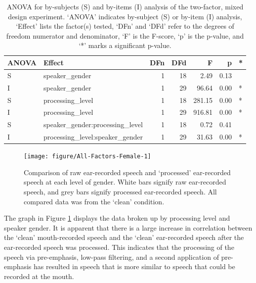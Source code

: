 \begin{table}[ht]
\centering
\begin{tabular}{llrrrrl}
  \hline
ANOVA & Effect & DFn & DFd & F & p & * \\ 
  \hline
S & speaker\_gender & 1 & 18 & 2.49 & 0.13 &  \\ 
  I & speaker\_gender & 1 & 29 & 96.64 & 0.00 & * \\ 
  S & processing\_level & 1 & 18 & 281.15 & 0.00 & * \\ 
  I & processing\_level & 1 & 29 & 916.81 & 0.00 & * \\ 
  S & speaker\_gender:processing\_level & 1 & 18 & 0.72 & 0.41 &  \\ 
  I & processing\_level:speaker\_gender & 1 & 29 & 31.63 & 0.00 & * \\ 
   \hline
\end{tabular}
\caption{ANOVA for by-subjects (S) and by-items (I) analysis of the two-factor, mixed design experiment. `ANOVA' indicates by-subject (S) or by-item (I) analysis, `Effect' lists the factor(s) tested, `DFn' and `DFd' refer to the degrees of freedom numerator and denominator, `F' is the F-score, `p' is the p-value, and `*' marks a significant p-value.} 
\label{tab:anova_data-collection}
\end{table}



\begin{figure}[h!]

\texttt{[image: figure/All-Factors-Female-1]} 

\caption{Comparison of raw ear-recorded speech and `processed' ear-recorded speech at each level of gender.  White bars signify raw ear-recorded speech, and grey bars signify processed ear-recorded speech. All compared data was from the `clean' condition.}\label{fig:data-collection-viz}
\end{figure}

The graph in Figure \ref{fig:data-collection-viz} displays the data broken up by processing level and speaker gender.  It is apparent that there is a large increase in correlation between the `clean' mouth-recorded speech and the `clean' ear-recorded speech after the ear-recorded speech was processed.  This indicates that the processing of the speech via pre-emphasis, low-pass filtering, and a second application of pre-emphasis has resulted in speech that is more similar to speech that could be recorded at the mouth.

